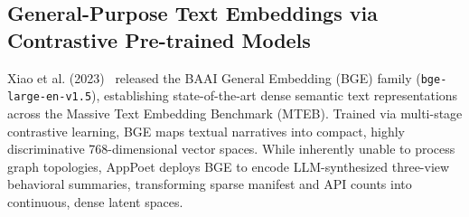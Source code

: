 \documentclass[12pt,a4paper,oneside]{report}
\begin{document}
\subsection{General-Purpose Text Embeddings via Contrastive Pre-trained Models}
Xiao et al. (2023)~\cite{ref10} released the BAAI General Embedding (BGE) family (\texttt{bge-large-en-v1.5}), establishing state-of-the-art dense semantic text representations across the Massive Text Embedding Benchmark (MTEB). Trained via multi-stage contrastive learning, BGE maps textual narratives into compact, highly discriminative 768-dimensional vector spaces. While inherently unable to process graph topologies, AppPoet deploys BGE to encode LLM-synthesized three-view behavioral summaries, transforming sparse manifest and API counts into continuous, dense latent spaces.

\clearpage
\end{document}

